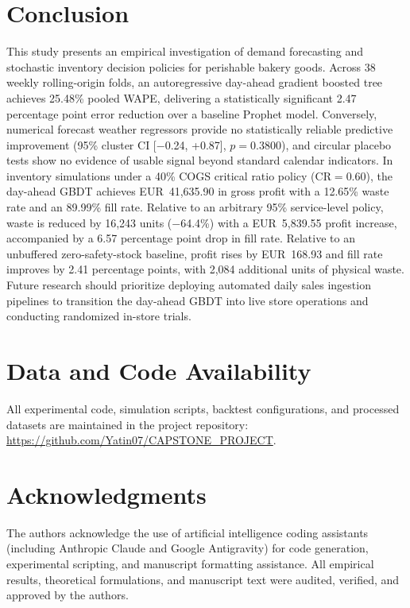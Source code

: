 \documentclass[conference]{IEEEtran}
\begin{document}
\section{Conclusion}
\label{sec:concl}
This study presents an empirical investigation of demand forecasting and stochastic inventory decision policies for perishable bakery goods. Across 38 weekly rolling-origin folds, an autoregressive day-ahead gradient boosted tree achieves 25.48\% pooled WAPE, delivering a statistically significant 2.47 percentage point error reduction over a baseline Prophet model. Conversely, numerical forecast weather regressors provide no statistically reliable predictive improvement (95\% cluster CI [$-$0.24, +0.87], $p = 0.3800$), and circular placebo tests show no evidence of usable signal beyond standard calendar indicators. In inventory simulations under a 40\% COGS critical ratio policy ($\text{CR}=0.60$), the day-ahead GBDT achieves EUR~41,635.90 in gross profit with a 12.65\% waste rate and an 89.99\% fill rate. Relative to an arbitrary 95\% service-level policy, waste is reduced by 16,243 units ($-$64.4\%) with a EUR~5,839.55 profit increase, accompanied by a 6.57 percentage point drop in fill rate. Relative to an unbuffered zero-safety-stock baseline, profit rises by EUR~168.93 and fill rate improves by 2.41 percentage points, with 2,084 additional units of physical waste. Future research should prioritize deploying automated daily sales ingestion pipelines to transition the day-ahead GBDT into live store operations and conducting randomized in-store trials.

\section*{Data and Code Availability}
All experimental code, simulation scripts, backtest configurations, and processed datasets are maintained in the project repository: \url{https://github.com/Yatin07/CAPSTONE_PROJECT}.

\section*{Acknowledgments}
The authors acknowledge the use of artificial intelligence coding assistants (including Anthropic Claude and Google Antigravity) for code generation, experimental scripting, and manuscript formatting assistance. All empirical results, theoretical formulations, and manuscript text were audited, verified, and approved by the authors.
\end{document}

